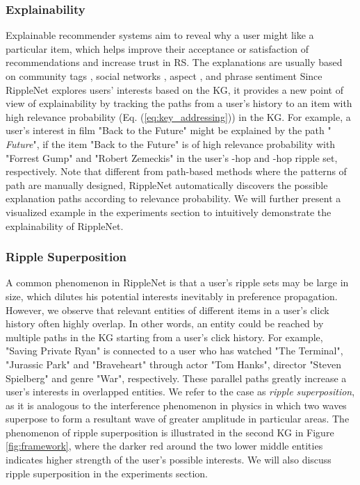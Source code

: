 \documentclass[sigconf]{acmart}
\begin{document}
		\subsubsection{Explainability}
		\label{sec:explainability}
			Explainable recommender systems \cite{tintarev2007survey} aim to reveal why a user might like a particular item, which helps improve their acceptance or satisfaction of recommendations and increase trust in RS.
			The explanations are usually based on community tags \cite{vig2009tagsplanations}, social networks \cite{sharma2013social}, aspect \cite{bauman2017aspect}, and phrase sentiment \cite{zhang2014explicit}
			Since RippleNet explores users' interests based on the KG, it provides a new point of view of explainability by tracking the paths from a user's history to an item with high relevance probability (Eq. (\ref{eq:key_addressing})) in the KG.
			For example, a user's interest in film "Back to the Future" might be explained by the path " \textit{Future}", if the item "Back to the Future" is of high relevance probability with "Forrest Gump" and "Robert Zemeckis" in the user's -hop and -hop ripple set, respectively.
			Note that different from path-based methods \cite{yu2014personalized,zhao2017meta} where the patterns of path are manually designed, RippleNet automatically discovers the possible explanation paths according to relevance probability.
			We will further present a visualized example in the experiments section to intuitively demonstrate the explainability of RippleNet.
		
		
		\subsubsection{Ripple Superposition}
		\label{sec:ripple_superposition}
			A common phenomenon in RippleNet is that a user's ripple sets may be large in size, which dilutes his potential interests inevitably in preference propagation.
			However, we observe that relevant entities of different items in a user's click history often highly overlap.
			In other words, an entity could be reached by multiple paths in the KG starting from a user's click history.
			For example, "Saving Private Ryan" is connected to a user who has watched "The Terminal", "Jurassic Park" and "Braveheart" through actor "Tom Hanks", director "Steven Spielberg" and genre "War", respectively.
			These parallel paths greatly increase a user's interests in overlapped entities.
			We refer to the case as \textit{ripple superposition}, as it is analogous to the interference phenomenon in physics in which two waves superpose to form a resultant wave of greater amplitude in particular areas.
			The phenomenon of ripple superposition is illustrated in the second KG in Figure \ref{fig:framework}, where the darker red around the two lower middle entities indicates higher strength of the user's possible interests.
			We will also discuss ripple superposition in the experiments section.
		
\end{document}
